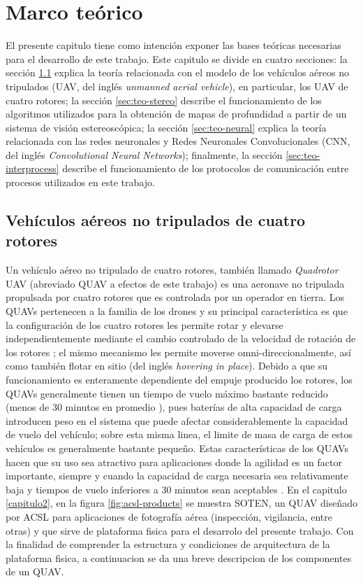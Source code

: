 \chapter{Marco teórico}
\label{capitulo3}

El presente capitulo tiene como intención exponer las bases teóricas necesarias para el desarrollo de este trabajo. Este capitulo se divide en cuatro secciones: la sección \ref{sec:teo-uav} explica la teoría relacionada con el modelo de los vehículos aéreos no tripulados (UAV, del inglés \textit{unmanned aerial vehicle}), en particular, los UAV de cuatro rotores; la sección \ref{sec:teo-stereo} describe el funcionamiento de los algoritmos utilizados para la obtención de mapas de profundidad a partir de un sistema de visión estereoscópica; la sección \ref{sec:teo-neural} explica la teoría relacionada con las redes neuronales y Redes Neuronales Convolucionales (CNN, del inglés \textit{Convolutional Neural Networks}); finalmente, la sección \ref{sec:teo-interprocess} describe el funcionamiento de los protocolos de comunicación entre procesos utilizados en este trabajo.

\section{Vehículos aéreos no tripulados de cuatro rotores}
\label{sec:teo-uav}

Un vehículo aéreo no tripulado de cuatro rotores, también llamado \textit{Quadrotor} UAV (abreviado QUAV a efectos de este trabajo) es una aeronave no tripulada propulsada por cuatro rotores que es controlada por un operador en tierra. Los QUAVs pertenecen a la familia de los drones y su principal característica es que la configuración de los cuatro rotores les permite rotar y elevarse independientemente mediante el cambio controlado de la velocidad de rotación de los rotores \cite{multidrone2017review}; el mismo mecanismo les permite moverse omni-direccionalmente, así como también flotar en sitio (del inglés \textit{hovering in place}). Debido a que su funcionamiento es enteramente dependiente del empuje producido los rotores, los QUAVs generalmente tienen un tiempo de vuelo máximo bastante reducido (menos de 30 minutos en promedio \cite{multidrone2017review}), pues baterías de alta capacidad de carga introducen peso en el sistema que puede afectar considerablemente la capacidad de vuelo del vehículo; sobre esta misma linea, el limite de masa de carga de estos vehículos es generalmente bastante pequeño. Estas características de los QUAVs hacen que su uso sea atractivo para aplicaciones donde la agilidad es un factor importante, siempre y cuando la capacidad de carga necesaria sea relativamente baja y tiempos de vuelo inferiores a 30 minutos sean aceptables \cite{multidrone2017review}. En el capitulo \ref{capitulo2}, en la figura \ref{fig:acsl-products} se muestra SOTEN, un QUAV diseñado por ACSL para aplicaciones de fotografía aérea (inspección, vigilancia, entre otras) y que sirve de plataforma fisica para el desarrolo del presente trabajo. Con la finalidad de comprender la estructura y condiciones de arquitectura de la plataforma fisica, a continuacion se da una breve descripcion de los componentes de un QUAV. 

